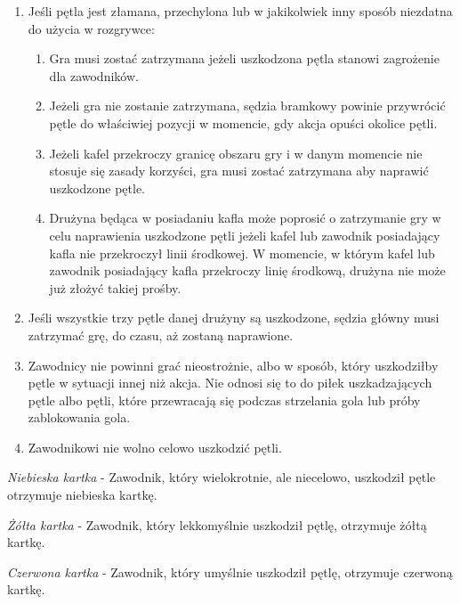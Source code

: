 \documentclass[12pt]{article}
\begin{document}
\begin{enumerate}
	\item
	      Jeśli pętla jest złamana, przechylona lub w jakikolwiek inny sposób
	      niezdatna do użycia w rozgrywce:

	      \begin{enumerate}
		      \item
		            Gra musi zostać zatrzymana jeżeli uszkodzona pętla stanowi
		            zagrożenie dla zawodników.
		      \item
		            Jeżeli gra nie zostanie zatrzymana, sędzia bramkowy powinie
		            przywrócić pętle do właściwiej pozycji w momencie, gdy akcja opuści
		            okolice pętli.
		      \item
		            Jeżeli kafel przekroczy granicę obszaru gry i w danym momencie nie
		            stosuje się zasady korzyści, gra musi zostać zatrzymana aby naprawić
		            uszkodzone pętle.
		      \item
		            Drużyna będąca w posiadaniu kafla może poprosić o zatrzymanie gry w
		            celu naprawienia uszkodzone pętli jeżeli kafel lub zawodnik
		            posiadający kafla nie przekroczył linii środkowej. W momencie, w
		            którym kafel lub zawodnik posiadający kafla przekroczy linię
		            środkową, drużyna nie może już złożyć takiej prośby.
	      \end{enumerate}
	\item
	      Jeśli wszystkie trzy pętle danej drużyny są uszkodzone, sędzia główny
	      musi zatrzymać grę, do czasu, aż zostaną naprawione.
	\item
	      Zawodnicy nie powinni grać nieostrożnie, albo w sposób, który
	      uszkodziłby pętle w sytuacji innej niż akcja. Nie odnosi się to do
	      piłek uszkadzających pętle albo pętli, które przewracają się podczas
	      strzelania gola lub próby zablokowania gola.
	\item
	      Zawodnikowi nie wolno celowo uszkodzić pętli.
\end{enumerate}

\emph{Niebieska kartka} - Zawodnik, który wielokrotnie, ale niecelowo,
uszkodził pętle otrzymuje niebieska kartkę.

\emph{Żółta kartka} - Zawodnik, który lekkomyślnie uszkodził pętlę,
otrzymuje żółtą kartkę.

\emph{Czerwona kartka} - Zawodnik, który umyślnie uszkodził
pętlę, otrzymuje czerwoną kartkę.
\end{document}
